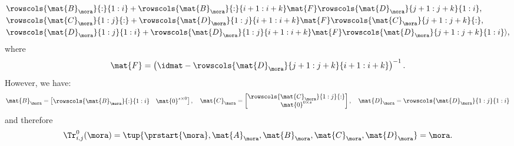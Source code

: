 {\begin{example}
\begin{equation*}
\begin{aligned}
                                                             & \rowscols{\mat{B}_{\mora}}{:}{1:i}+ \rowscols{\mat{B}_{\mora}}{:}{i+1:i+k}\mat{F}\rowscols{\mat{D}_{\mora}}{j+1:j+k}{1:i}, \\
                                                             & \rowscols{\mat{C}_{\mora}}{1:j}{:}+\rowscols{\mat{D}_{\mora}}{1:j}{i+1:i+k}\mat{F}\rowscols{\mat{C}_{\mora}}{j+1:j+k}{:}, \\
                                                             & \rowscols{\mat{D}_{\mora}}{1:j}{1:i}+ \rowscols{\mat{D}_{\mora}}{1:j}{i+1:i+k}\mat{F}\rowscols{\mat{D}_{\mora}}{j+1:j+k}{1:i}\rangle,
            \end{aligned}
        \end{equation*}
        where
        \begin{equation*}
            \mat{F}=\left(\idmat - \rowscols{\mat{D}_{\mora}}{j+1:j+k}{i+1:i+k}\right)^{-1}.
        \end{equation*}
        However, we have:
        \begin{equation*}
            \mat{B}_\mora=\begin{bmatrix}
                \rowscols{\mat{B}_{\mora}}{:}{1:i} & \mat{0}^{s\times 0}
            \end{bmatrix},\quad
            \mat{C}_\mora=\begin{bmatrix}
                \rowscols{\mat{C}_{\mora}}{1:j}{:} \\ \mat{0}^{0\times s}
            \end{bmatrix},
            \quad
            \mat{D}_\mora= \rowscols{\mat{D}_\mora}{1:j}{1:i}
        \end{equation*}
        and therefore
        \begin{equation*}
            \Tr_{i,j}^0 (\mora)=\tup{\prstart{\mora}, \mat{A}_\mora, \mat{B}_\mora, \mat{C}_\mora, \mat{D}_\mora}=\mora.
        \end{equation*}


\end{example}}
